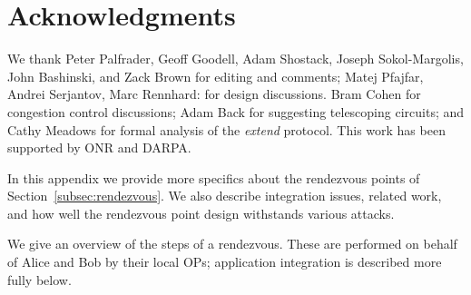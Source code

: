 \documentclass[times,10pt,twocolumn]{article}
\begin{document}

\section*{Acknowledgments}
 We thank Peter Palfrader, Geoff Goodell, Adam Shostack, Joseph Sokol-Margolis,
   John Bashinski, and Zack Brown
   for editing and comments;
 Matej Pfajfar, Andrei Serjantov, Marc Rennhard: for design discussions.
 Bram Cohen for congestion control discussions;
 Adam Back for suggesting telescoping circuits; and
 Cathy Meadows for formal analysis of the \emph{extend} protocol.
 This work has been supported by ONR and DARPA.





\appendix

\label{sec:rendezvous-specifics}

In this appendix we provide more specifics about the rendezvous points
of Section~\ref{subsec:rendezvous}. We also describe integration
issues, related work, and how well the rendezvous point design
withstands various attacks.


We give an overview of the steps of a rendezvous. These are
performed on behalf of Alice and Bob by their local OPs;
application integration is described more fully below.
\end{document}
